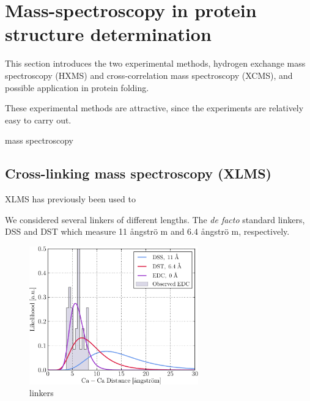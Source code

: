 
\chapter{Mass-spectroscopy in protein structure determination}

This section introduces the two experimental methods, hydrogen exchange mass spectroscopy (HXMS) and cross-correlation mass spectroscopy (XCMS), and possible application in protein folding.

These experimental methods are attractive, since the experiments are relatively easy to carry out.

mass spectroscopy 

\section{Cross-linking mass spectroscopy (XLMS)}


XLMS has previously been used to 

We considered several linkers of different lengths. The \textit{de facto} standard linkers, DSS and DST which measure 11 \aa ngstr\"o m and 6.4 \aa ngstr\"o m, respectively.

\begin{figure}
    \centering
    \includegraphics[width=0.65\textwidth]{figures/xcms/lognormal.pdf}
    \caption{linkers}
    \label{fig:linkers}
\end{figure}


